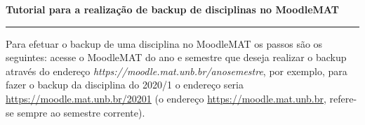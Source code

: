 \documentclass[12pt]{report}
\begin{document}
\begin{center}
{\Large \textbf{Tutorial para a realiza\c{c}\~ao de backup de disciplinas no MoodleMAT}}
\end{center}
\vspace{.3cm}
\hrule

\vspace{.7cm}

Para efetuar o backup de uma disciplina no MoodleMAT os passos s\~ao os seguintes: acesse o MoodleMAT do ano e semestre que deseja realizar o backup atrav\'es do endere\c{c}o \textit{https://moodle.mat.unb.br/anosemestre}, por exemplo, para fazer o backup da disciplina do 2020/1 o endere\c{c}o seria \href{https://moodle.mat.unb.br/20201}{https://moodle.mat.unb.br/20201} (o endere\c{c}o \href{https://moodle.mat.unb.br}{https://moodle.mat.unb.br}, refere-se sempre ao semestre corrente). 
\end{document}
